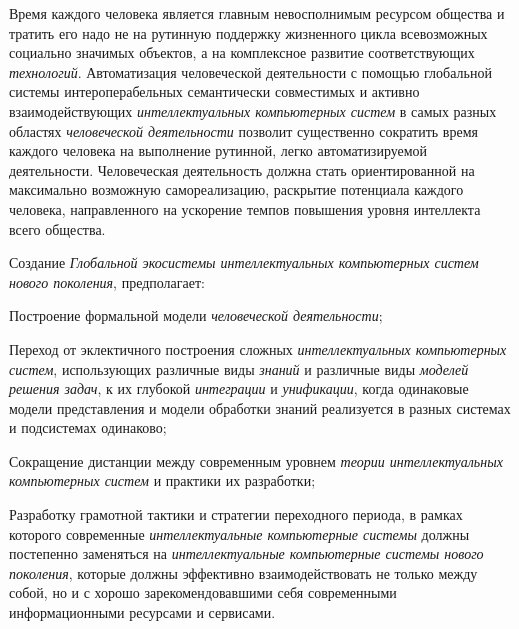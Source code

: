 Время каждого человека является главным невосполнимым ресурсом общества и тратить его надо не на рутинную поддержку жизненного цикла всевозможных социально значимых объектов, а на комплексное развитие соответствующих \textit{технологий}. Автоматизация человеческой деятельности с помощью глобальной системы интероперабельных семантически совместимых и активно взаимодействующих \textit{интеллектуальных компьютерных систем} в самых разных областях \textit{человеческой деятельности} позволит существенно сократить время каждого человека на выполнение рутинной, легко автоматизируемой деятельности. Человеческая деятельность должна стать ориентированной на максимально возможную самореализацию, раскрытие  потенциала каждого человека, направленного на ускорение темпов повышения уровня интеллекта всего общества.

Создание \textit{Глобальной экосистемы интеллектуальных компьютерных систем нового поколения}, предполагает:

\begin{textitemize}
	\item
	Построение формальной модели \textit{человеческой деятельности};
	\item
	Переход от эклектичного построения сложных \textit{интеллектуальных компьютерных систем}, использующих различные виды \textit{знаний} и различные виды \textit{моделей решения задач}, к их глубокой \textit{интеграции} и \textit{унификации}, когда одинаковые модели представления и модели обработки знаний реализуется в разных системах и подсистемах одинаково;
	\item
	Сокращение дистанции между современным уровнем \textit{теории интеллектуальных компьютерных систем} и практики их разработки;
	\item
	Разработку грамотной тактики и стратегии переходного периода, в рамках которого современные \textit{интеллектуальные компьютерные системы} должны постепенно заменяться на \textit{интеллектуальные компьютерные системы нового поколения}, которые должны эффективно взаимодействовать не только между собой, но и с хорошо зарекомендовавшими себя современными информационными ресурсами и сервисами.
\end{textitemize}

%